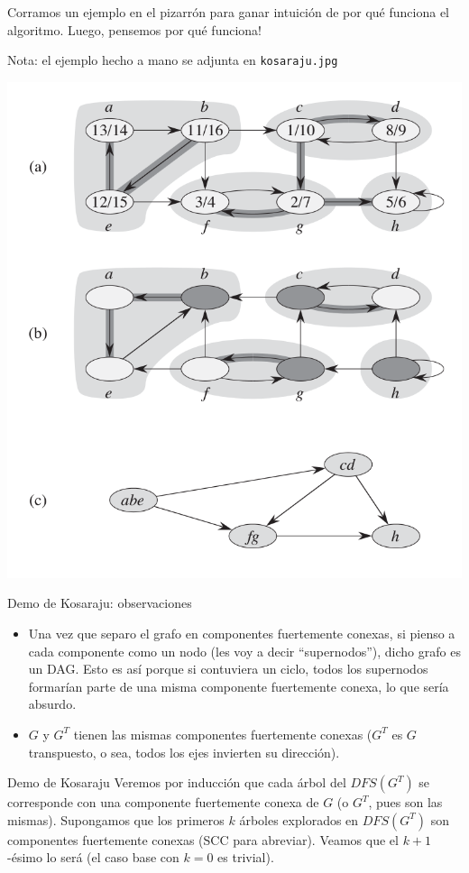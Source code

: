 \documentclass[compress]{beamer}
\begin{document}
\begin{frame}
Corramos un ejemplo en el pizarrón para ganar intuición de por qué funciona
el algoritmo. Luego, pensemos por qué funciona!

\bigskip
Nota: el ejemplo hecho a mano se adjunta en \texttt{kosaraju.jpg}
\end{frame}

\begin{frame}
\begin{center}
\includegraphics[width=0.5\linewidth]{kosaraju.png}
\end{center}
\end{frame}

\begin{frame}{Demo de Kosaraju: observaciones}
\begin{itemize}
\item Una vez que separo el grafo en componentes fuertemente conexas,
si pienso a cada componente como un nodo (les voy a decir 
``supernodos''), dicho grafo es un DAG. Esto es así porque si contuviera un ciclo, 
todos los supernodos formarían parte de una misma componente fuertemente
conexa, lo que sería absurdo.
\item $G$ y $G^T$ tienen las mismas componentes fuertemente conexas ($G^T$
es $G$ transpuesto, o sea, todos los ejes invierten su dirección).
\end{itemize}
\end{frame}

\begin{frame}{Demo de Kosaraju}
Veremos por inducción que cada árbol del $DFS(G^T)$ se corresponde con una
componente fuertemente conexa de $G$ (o $G^T$, pues son las mismas).
\bigskip
Supongamos que los primeros $k$ árboles explorados en $DFS(G^T)$ son
componentes fuertemente conexas (SCC para abreviar). Veamos que el $k+1$-ésimo
lo será (el caso base con $k = 0$ es trivial).
\end{frame}
\end{document}
